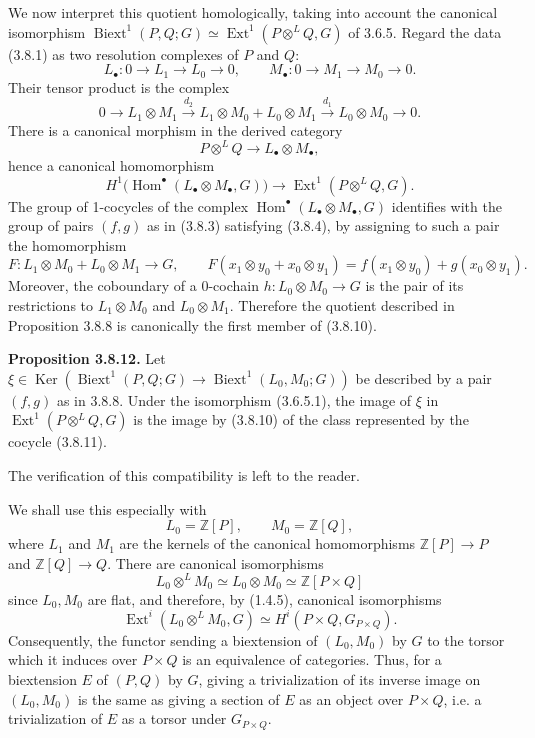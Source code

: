 \documentclass[11pt]{article}
\providecommand{\Ker}{\operatorname{Ker}}
\providecommand{\Z}{\mathbb Z}
\providecommand{\Hom}{\operatorname{Hom}}
\providecommand{\Ext}{\operatorname{Ext}}
\providecommand{\Biext}{\operatorname{Biext}}
\providecommand{\Ext}{\operatorname{Ext}}
\providecommand{\Ker}{\operatorname{Ker}}
\begin{document}
We now interpret this quotient homologically, taking into account the canonical isomorphism
\(\Biext^1(P,Q;G)\simeq\Ext^1(P\otimes^L Q,G)\) of 3.6.5.  Regard the data (3.8.1) as two resolution complexes of \(P\) and \(Q\):
\begin{equation}\tag{3.8.9}
        L_\bullet:0\longrightarrow L_1\longrightarrow L_0\longrightarrow 0,
        \qquad
        M_\bullet:0\longrightarrow M_1\longrightarrow M_0\longrightarrow 0.
\end{equation}
Their tensor product is the complex
\[
        0\longrightarrow L_1\otimes M_1
        \xrightarrow{d_2}L_1\otimes M_0+L_0\otimes M_1
        \xrightarrow{d_1}L_0\otimes M_0
        \longrightarrow0.
\]
There is a canonical morphism in the derived category
\[
        P\otimes^L Q\longrightarrow L_\bullet\otimes M_\bullet,
\]
hence a canonical homomorphism
\begin{equation}\tag{3.8.10}
        H^1\bigl(\Hom^\bullet(L_\bullet\otimes M_\bullet,G)\bigr)
        \longrightarrow \Ext^1(P\otimes^L Q,G).
\end{equation}
The group of 1-cocycles of the complex \(\Hom^\bullet(L_\bullet\otimes M_\bullet,G)\) identifies with the group of pairs \((f,g)\) as in (3.8.3) satisfying (3.8.4), by assigning to such a pair the homomorphism
\begin{equation}\tag{3.8.11}
        F:L_1\otimes M_0+L_0\otimes M_1\longrightarrow G,
        \qquad
        F(x_1\otimes y_0+x_0\otimes y_1)=f(x_1\otimes y_0)+g(x_0\otimes y_1).
\end{equation}
Moreover, the coboundary of a 0-cochain \(h:L_0\otimes M_0\to G\) is the pair of its restrictions to \(L_1\otimes M_0\) and \(L_0\otimes M_1\).  Therefore the quotient described in Proposition 3.8.8 is canonically the first member of (3.8.10).

\textbf{Proposition 3.8.12.}  Let \(\xi\in\Ker(\Biext^1(P,Q;G)\to\Biext^1(L_0,M_0;G))\) be described by a pair \((f,g)\) as in 3.8.8.  Under the isomorphism (3.6.5.1), the image of \(\xi\) in \(\Ext^1(P\otimes^L Q,G)\) is the image by (3.8.10) of the class represented by the cocycle (3.8.11).

The verification of this compatibility is left to the reader.

We shall use this especially with
\[
        L_0=\Z[P],\qquad M_0=\Z[Q],
\]
where \(L_1\) and \(M_1\) are the kernels of the canonical homomorphisms \(\Z[P]\to P\) and \(\Z[Q]\to Q\).  There are canonical isomorphisms
\[
        L_0\otimes^L M_0\simeq L_0\otimes M_0\simeq \Z[P\times Q]
\]
since \(L_0,M_0\) are flat, and therefore, by (1.4.5), canonical isomorphisms
\[
        \Ext^i(L_0\otimes^L M_0,G)
        \simeq H^i(P\times Q,G_{P\times Q}).
\]
Consequently, the functor sending a biextension of \((L_0,M_0)\) by \(G\) to the torsor which it induces over \(P\times Q\) is an equivalence of categories.  Thus, for a biextension \(E\) of \((P,Q)\) by \(G\), giving a trivialization of its inverse image on \((L_0,M_0)\) is the same as giving a section of \(E\) as an object over \(P\times Q\), i.e. a trivialization of \(E\) as a torsor under \(G_{P\times Q}\).
\end{document}

